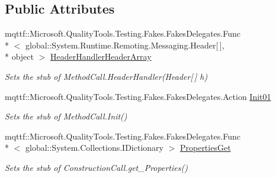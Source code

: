 \subsection*{Public Attributes}
\begin{DoxyCompactItemize}
\item 
mqttf\-::\-Microsoft.\-Quality\-Tools.\-Testing.\-Fakes.\-Fakes\-Delegates.\-Func\\*
$<$ global\-::\-System.\-Runtime.\-Remoting.\-Messaging.\-Header\mbox{[}$\,$\mbox{]}, \\*
object $>$ \hyperlink{class_system_1_1_runtime_1_1_remoting_1_1_messaging_1_1_fakes_1_1_stub_construction_call_ab88f5f81905368a41642450b5928963c}{Header\-Handler\-Header\-Array}
\begin{DoxyCompactList}\small\item\em Sets the stub of Method\-Call.\-Header\-Handler(\-Header\mbox{[}$\,$\mbox{]} h)\end{DoxyCompactList}\item 
mqttf\-::\-Microsoft.\-Quality\-Tools.\-Testing.\-Fakes.\-Fakes\-Delegates.\-Action \hyperlink{class_system_1_1_runtime_1_1_remoting_1_1_messaging_1_1_fakes_1_1_stub_construction_call_a4e1189053dcfa83daf2416510129f2b3}{Init01}
\begin{DoxyCompactList}\small\item\em Sets the stub of Method\-Call.\-Init()\end{DoxyCompactList}\item 
mqttf\-::\-Microsoft.\-Quality\-Tools.\-Testing.\-Fakes.\-Fakes\-Delegates.\-Func\\*
$<$ global\-::\-System.\-Collections.\-I\-Dictionary $>$ \hyperlink{class_system_1_1_runtime_1_1_remoting_1_1_messaging_1_1_fakes_1_1_stub_construction_call_a749f97b913073960fcde8bdbfde45645}{Properties\-Get}
\begin{DoxyCompactList}\small\item\em Sets the stub of Construction\-Call.\-get\-\_\-\-Properties()\end{DoxyCompactList}\end{DoxyCompactItemize}
